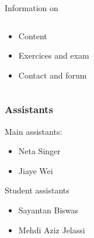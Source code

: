 \begin{frame}{Information on} 

    \begin{columns}
      \begin{column}{.5\textwidth}
        \begin{itemize}
        \item Content
         \item Exercices and exam
         \item Contact and forum
         \end{itemize}
       \end{column}
       \begin{column}{.5\textwidth}
       \end{column}
       
    \end{columns}
      
    
  
  \end{frame}
   



   \begin{frame}

     \begin{columns}
       \begin{column}{0.4\textwidth }                 
     \frametitle{Assistants}
     Main assistants:
     \begin{itemize}
     \item Neta Singer
     \item Jiaye Wei
     \end{itemize}

     \bigskip 
     
     Student assistants 
     \begin{itemize}
     \item Sayantan Biswas
     \item Mehdi Aziz Jelassi 
     \end{itemize}
   \end{column}
   \begin{column}{0.4\textwidth }
   \end{column}
 \end{columns}
\end{frame}

